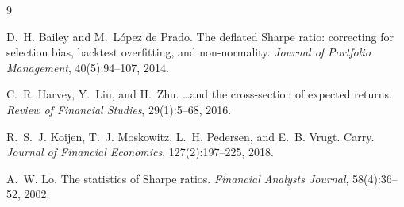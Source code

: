 \documentclass[11pt,a4paper]{article}
\begin{document}
\begin{thebibliography}{9}
\setlength{\itemsep}{2pt}\small

D.~H. Bailey and M.~L\'opez de Prado.
\newblock The deflated Sharpe ratio: correcting for selection bias, backtest
  overfitting, and non-normality.
\newblock \emph{Journal of Portfolio Management}, 40(5):94--107, 2014.

C.~R. Harvey, Y.~Liu, and H.~Zhu.
\newblock \ldots and the cross-section of expected returns.
\newblock \emph{Review of Financial Studies}, 29(1):5--68, 2016.

R.~S.~J. Koijen, T.~J. Moskowitz, L.~H. Pedersen, and E.~B. Vrugt.
\newblock Carry.
\newblock \emph{Journal of Financial Economics}, 127(2):197--225, 2018.

A.~W. Lo.
\newblock The statistics of Sharpe ratios.
\newblock \emph{Financial Analysts Journal}, 58(4):36--52, 2002.

\end{thebibliography}
\end{document}

